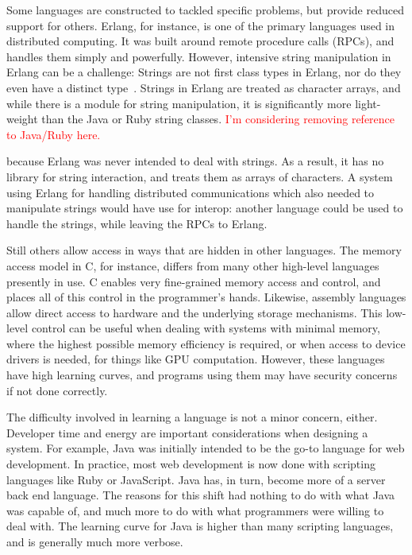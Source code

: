 \documentclass{sig-alternate}
\newcommand{\mycomment}[1]{\textcolor{red}{#1}}
\begin{document}
Some languages are constructed to tackled specific problems, but provide reduced support for others. Erlang, for instance, is one of the primary languages used in distributed computing. It was built around remote procedure calls (RPCs), and handles them simply and powerfully. However, intensive string manipulation in Erlang can be a challenge: Strings are not first class types in Erlang, nor do they even have a distinct type~\cite{ErlangTypeDoc}. Strings in Erlang are treated as character arrays, and while there is a module for string manipulation, it is significantly more light-weight than the Java or Ruby string classes. \mycomment{I'm considering removing reference to Java/Ruby here.}

 because Erlang was never intended to deal with strings. As a result, it has no library for string interaction, and treats them as arrays of characters. A system using Erlang for handling distributed communications which also needed to manipulate strings would have use for interop: another language could be used to handle the strings, while leaving the RPCs to Erlang.

Still others allow access in ways that are hidden in other languages. The memory access model in C, for instance, differs from many other high-level languages presently in use. C enables very fine-grained memory access and control, and places all of this control in the programmer's hands. Likewise, assembly languages allow direct access to hardware and the underlying storage mechanisms. This low-level control can be useful when dealing with systems with minimal memory, where the highest possible memory efficiency is required, or when access to device drivers is needed, for things like GPU computation.  However, these languages have high learning curves, and programs using them may have security concerns if not done correctly.

The difficulty involved in learning a language is not a minor concern, either. Developer time and energy are important considerations when designing a system.
For example, Java was initially intended to be the go-to language for web development. In practice, most web development is now done with scripting languages like Ruby or JavaScript. Java has, in turn, become more of a server back end language. The reasons for this shift had nothing to do with what Java was capable of, and much more to do with what programmers were willing to deal with.
The learning curve for Java is higher than many scripting languages, and is generally much more verbose.
\end{document}
